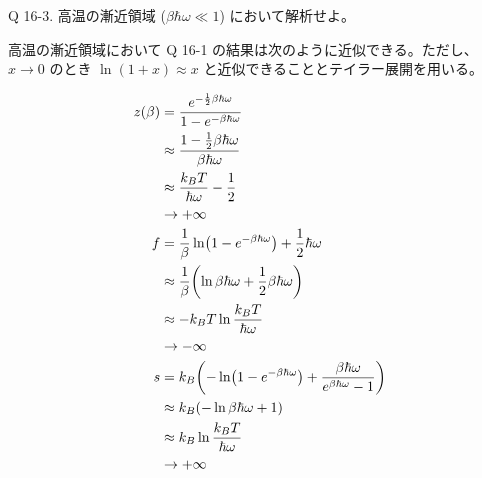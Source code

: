 \documentclass[uplatex,dvipdfmx,a4paper,11pt]{jlreq}
\theoremstyle{definition}
\begin{document}
\begin{itembox}[l]{Q 16-3.}
  高温の漸近領域 ($\beta\hbar\omega \ll 1$) において解析せよ。
\end{itembox}

高温の漸近領域において Q 16-1 の結果は次のように近似できる。ただし、$x\to 0$ のとき $\ln(1 + x) \approx x$ と近似できることとテイラー展開を用いる。

\begin{align}
  z(\beta) & = \frac{e^{-\frac{1}{2}\beta\hbar\omega}}{1 - e^{-\beta\hbar\omega}}                                                             \\
           & \approx \frac{1 - \frac{1}{2}\beta\hbar\omega}{\beta\hbar\omega}                                                                 \\
           & \approx \frac{k_BT}{\hbar\omega} - \frac{1}{2}                                                                                   \\
           & \to +\infty                                                                                                                      \\
  f        & = \frac{1}{\beta}\ln(1 - e^{-\beta\hbar\omega}) + \frac{1}{2}\hbar\omega                                                         \\
           & \approx \frac{1}{\beta}\qty(\ln \beta\hbar\omega + \frac{1}{2}\beta\hbar\omega)                                                  \\
           & \approx -k_BT\ln\frac{k_BT}{\hbar\omega}                                                                                         \\
           & \to - \infty                                                                                                                     \\
  s        & = k_B\qty(-\ln(1 - e^{-\beta\hbar\omega}) + \frac{\beta\hbar\omega}{e^{\beta\hbar\omega} - 1})                                   \\
           & \approx k_B\qty(-\ln\beta\hbar\omega + 1)                                                                                        \\
           & \approx k_B\ln\frac{k_BT}{\hbar\omega}                                                                                           \\
           & \to +\infty                                                                                                                      \\

\end{align}
\end{document}
